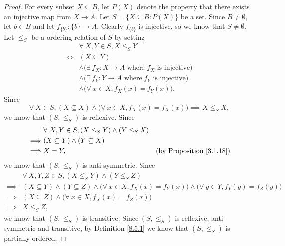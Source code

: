 \begin{proof}
    For every subset \(X \subseteq B\), let \(P(X)\) denote the property that there exists an injective map from \(X \to A\).
    Let \(S = \{X \subseteq B : P(X)\}\) be a set.
    Since \(B \neq \emptyset\), let \(b \in B\) and let \(f_{\{b\}} : \{b\} \to A\).
    Clearly \(f_{\{b\}}\) is injective, so we know that \(S \neq \emptyset\).
    Let \(\leq_S\) be a ordering relation of \(S\) by setting
    \begin{align*}
             & \forall\ X, Y \in S, X \leq_S Y                                           \\
        \iff & (X \subseteq Y)                                                           \\
             & \land \big(\exists\ f_X : X \to A \text{ where \(f_X\) is injective}\big) \\
             & \land \big(\exists\ f_Y : Y \to A \text{ where \(f_Y\) is injective}\big) \\
             & \land \big(\forall\ x \in X, f_X(x) = f_Y(x)\big).
    \end{align*}
    Since
    \[
        \forall\ X \in S, (X \subseteq X) \land \big(\forall\ x \in X, f_X(x) = f_X(x)\big) \implies X \leq_S X,
    \]
    we know that \((S, \leq_S)\) is reflexive.
    Since
    \begin{align*}
                 & \forall\ X, Y \in S, (X \leq_S Y) \land (Y \leq_S X)                                        \\
        \implies & (X \subseteq Y) \land (Y \subseteq X)                                                       \\
        \implies & X = Y,                                               & \text{(by Proposition \ref{3.1.18})}
    \end{align*}
    we know that \((S, \leq_S)\) is anti-symmetric.
    Since
    \begin{align*}
                 & \forall\ X, Y, Z \in S, (X \leq_S Y) \land (Y \leq_S Z)                                                                                   \\
        \implies & (X \subseteq Y) \land (Y \subseteq Z) \land \big(\forall\ x \in X, f_X(x) = f_Y(x)\big) \land \big(\forall\ y \in Y, f_Y(y) = f_Z(y)\big) \\
        \implies & (X \subseteq Z) \land \big(\forall\ x \in X, f_X(x) = f_Z(x)\big)                                                                         \\
        \implies & X \leq_S Z,
    \end{align*}
    we know that \((S, \leq_S)\) is transitive.
    Since \((S, \leq_S)\) is reflexive, anti-symmetric and transitive, by Definition \ref{8.5.1} we know that \((S, \leq_S)\) is partially ordered.


\end{proof}
